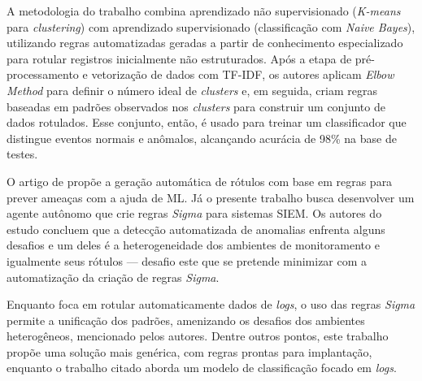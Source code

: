 A metodologia do trabalho combina aprendizado não supervisionado (\textit{K-means}
para \textit{clustering}) com aprendizado supervisionado (classificação com \textit{Naive Bayes}),
utilizando regras automatizadas geradas a partir de conhecimento especializado para rotular registros inicialmente não estruturados. 
Após a etapa de pré-processamento e vetorização de dados com TF-IDF, 
os autores aplicam \textit{Elbow Method} para definir o número ideal de \textit{clusters} e,
em seguida, criam regras baseadas em padrões observados nos \textit{clusters} para construir um conjunto de dados rotulados. 
Esse conjunto, então, é usado para treinar um classificador que distingue eventos normais e anômalos, alcançando acurácia de 98\% na base de testes.

O artigo de  propõe a geração automática de rótulos com base em regras para prever ameaças com a ajuda de ML. 
Já o presente trabalho busca desenvolver um agente autônomo que crie regras \textit{Sigma} para sistemas SIEM. 
Os autores do estudo concluem que a detecção automatizada de anomalias enfrenta alguns desafios e um deles é a heterogeneidade dos ambientes de monitoramento e igualmente seus rótulos --- 
desafio este que se pretende minimizar com a automatização da criação de regras \textit{Sigma}.

Enquanto  foca em rotular automaticamente dados de \textit{logs}, o uso das regras \textit{Sigma} permite a unificação dos padrões, amenizando os desafios dos ambientes heterogêneos, mencionado pelos autores. 
Dentre outros pontos, este trabalho propõe uma solução mais genérica, com regras prontas para implantação, enquanto o trabalho citado aborda um modelo de classificação focado em \textit{logs}.


